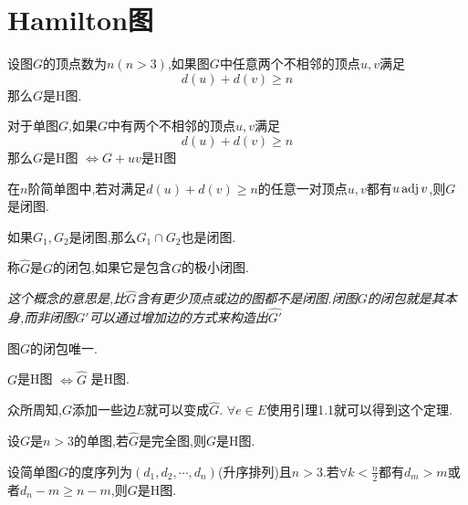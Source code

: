 \section{Hamilton图}
\begin{theorem}
    设图$G$的顶点数为$n(n > 3)$,如果图$G$中任意两个不相邻的顶点$u,v$满足
    \begin{equation*}
        d(u) + d(v) \ge n
    \end{equation*}
    那么$G$是H图.
\end{theorem}

\begin{lemma}
对于单图$G$,如果$G$中有两个不相邻的顶点$u,v$满足
\begin{equation*}
    d(u) + d(v) \ge n
\end{equation*}
那么$G$是H图 $\iff G+uv$是H图
\end{lemma}

\begin{definition}[闭图]
在$n$阶简单图中,若对满足$d(u)+d(v) \ge n$的任意一对顶点$u,v$都有$u \operatorname{adj} v$,则$G$是闭图.
\end{definition}

\begin{lemma}
如果$G_1,G_2$是闭图,那么$G_1 \cap G_2$也是闭图.
\end{lemma}

\begin{definition}[图的闭包]
称$\hat{G}$是$G$的闭包,如果它是包含$G$的极小闭图.
\end{definition}

\textit{这个概念的意思是,比$\hat{G}$含有更少顶点或边的图都不是闭图.闭图$G$的闭包就是其本身,而非闭图$G'$可以通过增加边的方式来构造出$\hat{G'}$}

\begin{lemma}
图$G$的闭包唯一.
\end{lemma}

\begin{theorem}[闭包定理]
    $G$是H图 $\iff \hat{G}$ 是H图.
\end{theorem}

众所周知,$G$添加一些边$E$就可以变成$\hat{G}$. $\forall e \in E$使用引理1.1就可以得到这个定理.

\begin{deduction}
设$G$是$n>3$的单图,若$\hat{G}$是完全图,则$G$是H图.
\end{deduction}

\begin{theorem}[Chavatal度序列判定法]
    设简单图$G$的度序列为$(d_1,d_2,\cdots,d_n)$(升序排列)且$n>3$.若$\forall k < \frac{n}{2}$都有$d_m > m$或者$d_n-m \ge n - m$,则$G$是H图.
\end{theorem}

